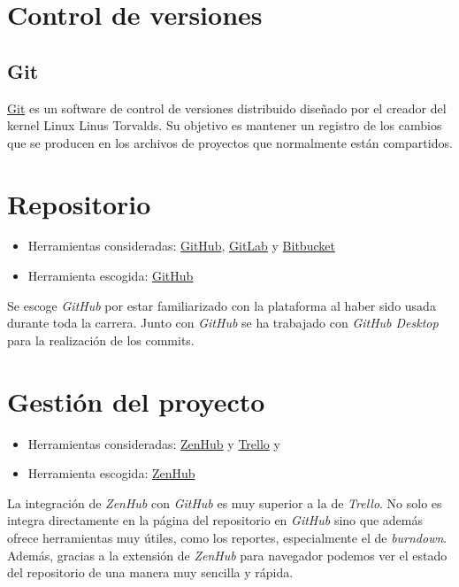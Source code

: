 \section{Control de versiones}\label{control-de-versiones}
\subsection{Git}\label{git}
\href{https://git-scm.com/}{Git} es un software de control de versiones distribuido diseñado por el creador del kernel Linux Linus Torvalds. Su objetivo es mantener un registro de los cambios que se producen en los archivos de proyectos que normalmente están compartidos.

\section{Repositorio}\label{repositorio}
\begin{itemize}
\tightlist
\item Herramientas consideradas: 
	\href{https://github.com/}{GitHub}, 
	\href{https://about.gitlab.com/}{GitLab} y
	\href{https://bitbucket.org/}{Bitbucket}
\item Herramienta escogida:
	\href{https://github.com/}{GitHub}
\end{itemize}
Se escoge \textit{GitHub} por estar familiarizado con la plataforma al haber sido usada durante toda la carrera. Junto con \textit{GitHub} se ha trabajado con \textit{GitHub Desktop} para la realización de los commits.

\section{Gestión del proyecto}\label{gestion-del-proyecto}
\begin{itemize}
\tightlist
\item Herramientas consideradas: 
	\href{https://www.zenhub.com/}{ZenHub} y 
	\href{https://trello.com/}{Trello} y
\item Herramienta escogida:
	\href{https://www.zenhub.com/}{ZenHub}
\end{itemize}
La integración de \textit{ZenHub} con \textit{GitHub} es muy superior a la de \textit{Trello}. No solo es integra directamente en la página del repositorio en \textit{GitHub} sino que además ofrece herramientas muy útiles, como los reportes, especialmente el de \textit{burndown}. Además, gracias a la extensión de \textit{ZenHub} para navegador podemos ver el estado del repositorio de una manera muy sencilla y rápida.

